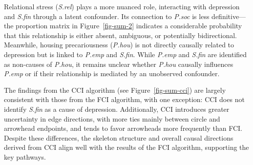 \documentclass[
]{article}
\begin{document}
Relational stress (\emph{S.rel}) plays a more nuanced role, interacting
with depression and \emph{S.fin} through a latent confounder. Its
connection to \emph{P.soc} is less definitive---the proportion matrix in
Figure~\ref{fig-sum-2} indicates a considerable probability that this
relationship is either absent, ambiguous, or potentially bidirectional.
Meanwhile, housing precariousness (\emph{P.hou}) is not directly
causally related to depression but is linked to \emph{P.emp} and
\emph{S.fin}. While \emph{P.emp} and \emph{S.fin} are identified as
non-causes of \emph{P.hou}, it remains unclear whether \emph{P.hou}
causally influences \emph{P.emp} or if their relationship is mediated by
an unobserved confounder.

The findings from the CCI algorithm (see Figure~\ref{fig-sum-cci}) are
largely consistent with those from the FCI algorithm, with one
exception: CCI does not identify \emph{S.fin} as a cause of depression.
Additionally, CCI introduces greater uncertainty in edge directions,
with more ties mainly between circle and arrowhead endpoints, and tends
to favor arrowheads more frequently than FCI. Despite these differences,
the skeleton structure and overall causal directions derived from CCI
align well with the results of the FCI algorithm, supporting the key
pathways.
\end{document}
